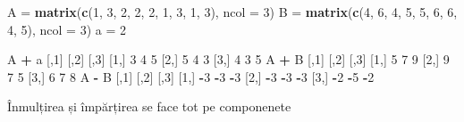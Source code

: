 \documentclass[]{article}
\newenvironment{Shaded}{\begin{snugshade}}{\end{snugshade}}
\newcommand{\KeywordTok}[1]{\textcolor[rgb]{0.13,0.29,0.53}{\textbf{#1}}}
\newcommand{\DataTypeTok}[1]{\textcolor[rgb]{0.13,0.29,0.53}{#1}}
\newcommand{\DecValTok}[1]{\textcolor[rgb]{0.00,0.00,0.81}{#1}}
\newcommand{\StringTok}[1]{\textcolor[rgb]{0.31,0.60,0.02}{#1}}
\newcommand{\OperatorTok}[1]{\textcolor[rgb]{0.81,0.36,0.00}{\textbf{#1}}}
\newcommand{\NormalTok}[1]{#1}
\begin{document}
\begin{Shaded}
\begin{Highlighting}[]
\NormalTok{A =}\StringTok{ }\KeywordTok{matrix}\NormalTok{(}\KeywordTok{c}\NormalTok{(}\DecValTok{1}\NormalTok{, }\DecValTok{3}\NormalTok{, }\DecValTok{2}\NormalTok{, }\DecValTok{2}\NormalTok{, }\DecValTok{2}\NormalTok{, }\DecValTok{1}\NormalTok{, }\DecValTok{3}\NormalTok{, }\DecValTok{1}\NormalTok{, }\DecValTok{3}\NormalTok{), }\DataTypeTok{ncol =} \DecValTok{3}\NormalTok{)}
\NormalTok{B =}\StringTok{ }\KeywordTok{matrix}\NormalTok{(}\KeywordTok{c}\NormalTok{(}\DecValTok{4}\NormalTok{, }\DecValTok{6}\NormalTok{, }\DecValTok{4}\NormalTok{, }\DecValTok{5}\NormalTok{, }\DecValTok{5}\NormalTok{, }\DecValTok{6}\NormalTok{, }\DecValTok{6}\NormalTok{, }\DecValTok{4}\NormalTok{, }\DecValTok{5}\NormalTok{), }\DataTypeTok{ncol =} \DecValTok{3}\NormalTok{)}
\NormalTok{a =}\StringTok{ }\DecValTok{2}

\NormalTok{A }\OperatorTok{+}\StringTok{ }\NormalTok{a}
\NormalTok{     [,}\DecValTok{1}\NormalTok{] [,}\DecValTok{2}\NormalTok{] [,}\DecValTok{3}\NormalTok{]}
\NormalTok{[}\DecValTok{1}\NormalTok{,]    }\DecValTok{3}    \DecValTok{4}    \DecValTok{5}
\NormalTok{[}\DecValTok{2}\NormalTok{,]    }\DecValTok{5}    \DecValTok{4}    \DecValTok{3}
\NormalTok{[}\DecValTok{3}\NormalTok{,]    }\DecValTok{4}    \DecValTok{3}    \DecValTok{5}
\NormalTok{A }\OperatorTok{+}\StringTok{ }\NormalTok{B}
\NormalTok{     [,}\DecValTok{1}\NormalTok{] [,}\DecValTok{2}\NormalTok{] [,}\DecValTok{3}\NormalTok{]}
\NormalTok{[}\DecValTok{1}\NormalTok{,]    }\DecValTok{5}    \DecValTok{7}    \DecValTok{9}
\NormalTok{[}\DecValTok{2}\NormalTok{,]    }\DecValTok{9}    \DecValTok{7}    \DecValTok{5}
\NormalTok{[}\DecValTok{3}\NormalTok{,]    }\DecValTok{6}    \DecValTok{7}    \DecValTok{8}
\NormalTok{A }\OperatorTok{-}\StringTok{ }\NormalTok{B}
\NormalTok{     [,}\DecValTok{1}\NormalTok{] [,}\DecValTok{2}\NormalTok{] [,}\DecValTok{3}\NormalTok{]}
\NormalTok{[}\DecValTok{1}\NormalTok{,]   }\OperatorTok{-}\DecValTok{3}   \OperatorTok{-}\DecValTok{3}   \OperatorTok{-}\DecValTok{3}
\NormalTok{[}\DecValTok{2}\NormalTok{,]   }\OperatorTok{-}\DecValTok{3}   \OperatorTok{-}\DecValTok{3}   \OperatorTok{-}\DecValTok{3}
\NormalTok{[}\DecValTok{3}\NormalTok{,]   }\OperatorTok{-}\DecValTok{2}   \OperatorTok{-}\DecValTok{5}   \OperatorTok{-}\DecValTok{2}
\end{Highlighting}
\end{Shaded}

Înmulțirea și împărțirea se face tot pe componenete
\end{document}
